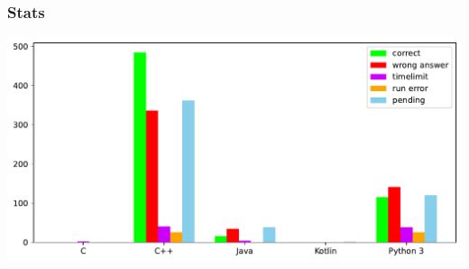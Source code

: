 \begin{frame}
    \frametitle{Stats}
    \includegraphics[width=\textwidth]{solve_stats/language_stats}%
\end{frame}
